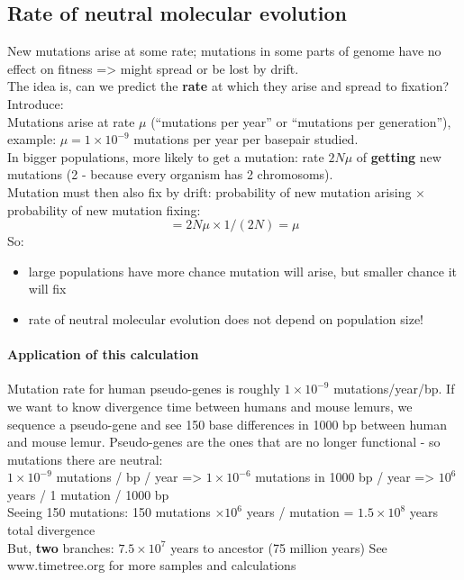 \documentclass{scrartcl}
\begin{document}
\subsection{Rate of neutral molecular evolution}
\label{sec:07-06}
New mutations arise at some rate; mutations in some parts of genome have no effect on fitness => might spread or be lost by drift.\\
The idea is, can we predict the {\bf rate} at which they arise and spread to fixation?\\
Introduce:\\
Mutations arise at rate $\mu$ (``mutations per year'' or ``mutations per generation''), example: $\mu = 1 \times 10^{-9}$ mutations per year per basepair studied.\\
In bigger populations, more likely to get a mutation: rate $2N\mu$ of {\bf getting} new mutations (2 - because every organism has 2 chromosoms).\\
Mutation must then also fix by drift: probability of new mutation arising $\times$ probability of new mutation fixing:
$$= 2 N \mu \times 1/(2N) = \mu $$
So:
\begin{itemize}
\item large populations have more chance mutation will arise, but smaller chance it will fix
\item rate of neutral molecular evolution does not depend on population size!
\end{itemize}

\paragraph{Application of this calculation}
Mutation rate for human pseudo-genes is roughly $1 \times 10^{-9}$ mutations/year/bp.
If we want to know divergence time between humans and mouse lemurs, we sequence a pseudo-gene and see 150 base differences in 1000 bp between human and mouse lemur.
Pseudo-genes are the ones that are no longer functional - so mutations there are neutral:\\
$1 \times 10^{-9}$ mutations / bp / year => $1 \times 10^{-6}$ mutations in 1000 bp / year => $10^6$ years / 1 mutation / 1000 bp\\
Seeing 150 mutations: 150 mutations $\times 10^6$ years / mutation = $1.5 \times 10^8$ years total divergence\\
But, {\bf two} branches: $7.5 \times 10^7$ years to ancestor (75 million years)
See www.timetree.org for more samples and calculations
\end{document}
